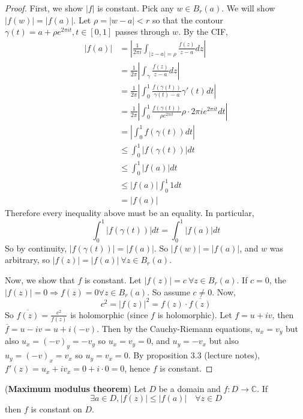\begin{proof}
	First, we show $|f|$ is constant. Pick any $w \in B_r(a)$. We will show $|f(w)| = |f(a)|$. Let $\rho = |w - a| < r$ so that the contour $\gamma(t) = a + \rho e^{2 \pi i t}, t \in [0, 1]$ passes through $w$. By the CIF,
	\[
		\begin{aligned}
			|f(a)|
				& = \left| \frac{1}{2 \pi i} \int_{|z - a| = \rho} \frac{f(z)}{z - a} dz \right| \\
				& = \frac{1}{2 \pi} \left| \int_{\gamma} \frac{f(z)}{z - a} dz \right| \\
				& = \frac{1}{2 \pi} \left| \int_{0}^{1} \frac{f(\gamma(t))}{\gamma(t) - a} \gamma'(t) dt \right| \\
				& = \frac{1}{2 \pi} \left| \int_{0}^{1} \frac{f(\gamma(t))}{\rho e^{2 \pi i t}} \rho \cdot 2 \pi i e^{2 \pi i t} dt \right| \\
				& = \left| \int_{0}^{1} f(\gamma(t)) dt \right| \\
				& \le \int_{0}^{1} |f(\gamma(t))| dt \\
				& \le \int_{0}^{1} |f(a)| dt \\
				& \le |f(a)| \int_{0}^{1} 1 dt \\
				& = |f(a)|
		\end{aligned}
	\]
	Therefore every inequality above must be an equality. In particular,
	\[
		\int_{0}^{1} |f(\gamma(t))| dt = \int_{0}^{1} |f(a)| dt
	\]
	So by continuity, $|f(\gamma(t))| = |f(a)|$. So $|f(w)| = |f(a)|$, and $w$ was arbitrary, so $|f(z)| = |f(a)| \ \forall z \in B_r(a)$.

	Now, we show that $f$ is constant. Let $|f(z)| = c \ \forall z \in B_r(a)$. If $c = 0$, the $|f(z)| = 0 \Rightarrow f(z) = 0 \forall z \in B_r(a)$. So assume $c \ne 0$. Now,
	\[
		c^2 = |f(z)|^2 = f(z) \cdot \overline{f(z)}
	\]
	So $\overline{f(z)} = \frac{c^2}{f(z)}$ is holomorphic (since $f$ is holomorphic). Let $f = u + iv$, then $\overline{f} = u - iv = u + i(-v)$. Then by the Cauchy-Riemann equations, $u_x = v_y$ but also $u_x = {(-v)}_y = -v_y$ so $u_x = v_y = 0$, and $u_y = -v_x$ but also $u_y = {(-v)}_x = v_x$ so $u_y = v_x = 0$. By proposition 3.3 (lecture notes), $f'(z) = u_x + i v_x = 0 + i \cdot 0 = 0$, hence $f$ is constant.
\end{proof}

\begin{theorem}
	(\textbf{Maximum modulus theorem}) Let $D$ be a domain and $f: D \rightarrow \mathbb{C}$. If
	\[
		\exists a \in D, |f(z)| \le |f(a)| \quad \forall z \in D
	\]
	then $f$ is constant on $D$.
\end{theorem}


